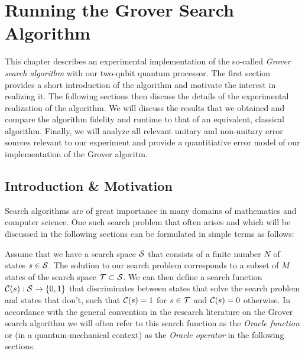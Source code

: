 
\chapter{Running the Grover Search Algorithm} \label{chapter:grover_algorithm}

This chapter describes an experimental implementation of the so-called {\it Grover search algorithm} with our two-qubit quantum processor. The first section provides a short introduction of the algorithm and motivate the interest in realizing it. The following sections then discuss the details of the experimental realization of the algorithm. We will discuss the results that we obtained and compare the algorithm fidelity and runtime to that of an equivalent, classical algorithm. Finally, we will analyze all relevant unitary and non-unitary error sources relevant to our experiment and provide a quantitiative error model of our implementation of the Grover algoritm.

\section{Introduction \& Motivation}

Search algorithms are of great importance in many domains of mathematics and computer science. One such search problem that often arises and which will be discussed in the following sections can be formulated in simple terms as follows:

\begin{theorem}
Assume that we have a search space $\begin{mathcal}S\end{mathcal}$ that consists of a finite number $N$ of states $s \in \begin{mathcal}S\end{mathcal}$. The solution to our search problem corresponds to a subset of $M$ states of the search space $\begin{mathcal}T\end{mathcal} \subset \begin{mathcal}S\end{mathcal}$. We can then define a search function $\Or(s):\begin{mathcal}S\end{mathcal}\to \{0,1\}$ that discriminates between states that solve the search problem and states that don't, such that $\Or(s) = 1$ for $s \in \begin{mathcal}T\end{mathcal}$ and $\Or(s) = 0$ otherwise. In accordance with the general convention in the research literature on the Grover search algorithm we will  often refer to this search function as the {\it Oracle function} or (in a quantum-mechanical context) as the {\it Oracle operator} in the following sections.
\end{theorem}

